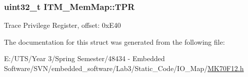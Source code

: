 \subsubsection[{T\+P\+R}]{\setlength{\rightskip}{0pt plus 5cm}uint32\+\_\+t I\+T\+M\+\_\+\+Mem\+Map\+::\+T\+P\+R}\label{struct_i_t_m___mem_map_a24ac79f5d070330282c6c0feae3cbcc1}
Trace Privilege Register, offset\+: 0x\+E40 

The documentation for this struct was generated from the following file\+:\begin{DoxyCompactItemize}
\item 
E\+:/\+U\+T\+S/\+Year 3/\+Spring Semester/48434 -\/ Embedded Software/\+S\+V\+N/embedded\+\_\+software/\+Lab3/\+Static\+\_\+\+Code/\+I\+O\+\_\+\+Map/\hyperlink{_m_k70_f12_8h}{M\+K70\+F12.\+h}\end{DoxyCompactItemize}
